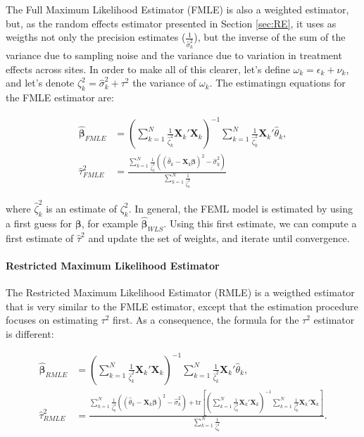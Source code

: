 \documentclass[
]{book}
\theoremstyle{definition}
\theoremstyle{definition}
\theoremstyle{definition}
\theoremstyle{definition}
\theoremstyle{remark}
\begin{document}
The Full Maximum Likelihood Estimator (FMLE) is also a weighted estimator, but, as the random effects estimator presented in Section \ref{sec:RE}, it uses as weigths not only the precision estimates (\(\frac{1}{\hat{\sigma}^2_k}\)), but the inverse of the sum of the variance due to sampling noise and the variance due to variation in treatment effects across sites.
In order to make all of this clearer, let's define \(\omega_k = \epsilon_k + \nu_k\), and let's denote \(\zeta^2_{k}=\hat{\sigma}^2_k+\tau^2\) the variance of \(\omega_k\).
The estimatingn equations for the FMLE estimator are:

\begin{align*}
  \mathbf{\hat{\beta}}_{FMLE} & = \left(\sum_{k=1}^N\frac{1}{\hat{\zeta}^2_k}\mathbf{X}_k'\mathbf{X}_k\right)^{-1}\sum_{k=1}^N\frac{1}{\hat{\zeta}^2_k}\mathbf{X}_k'\hat{\theta}_k,\\
 \hat{\tau}^2_{FMLE} & = \frac{\sum_{k=1}^N\frac{1}{\hat{\zeta}^4_k}\left((\hat{\theta}_k -\mathbf{X}_k\mathbf{\beta})^2-\hat{\sigma}^2_k\right)}{\sum_{k=1}^N\frac{1}{\hat{\zeta}^4_k}}
\end{align*}

where \(\hat{\zeta}^2_k\) is an estimate of \(\zeta^2_{k}\).
In general, the FEML model is estimated by using a first guess for \(\mathbf{\beta}\), for example \(\mathbf{\hat{\beta}}_{WLS}\).
Using this first estimate, we can compute a first estimate of \(\hat{\tau}^2\) and update the set of weights, and iterate until convergence.

\hypertarget{restricted-maximum-likelihood-estimator}{%
\paragraph{Restricted Maximum Likelihood Estimator}\label{restricted-maximum-likelihood-estimator}}

The Restricted Maximum Likelihood Estimator (RMLE) is a weigthed estimator that is very similar to the FMLE estimator, except that the estimation procedure focuses on estimating \(\tau^2\) first.
As a consequence, the formula for the \(\tau^2\) estimator is different:

\begin{align*}
  \mathbf{\hat{\beta}}_{RMLE} & = \left(\sum_{k=1}^N\frac{1}{\hat{\zeta}^2_k}\mathbf{X}_k'\mathbf{X}_k\right)^{-1}\sum_{k=1}^N\frac{1}{\hat{\zeta}^2_k}\mathbf{X}_k'\hat{\theta}_k,\\
 \hat{\tau}^2_{RMLE} & = \frac{\sum_{k=1}^N\frac{1}{\hat{\zeta}^4_k}\left((\hat{\theta}_k -\mathbf{X}_k\mathbf{\beta})^2-\hat{\sigma}^2_k\right)
                          +\text{tr}\left[\left(\sum_{k=1}^N\frac{1}{\hat{\zeta}^2_k}\mathbf{X}_k'\mathbf{X}_k\right)^{-1}\sum_{k=1}^N\frac{1}{\hat{\zeta}^2_k}\mathbf{X}_k'\mathbf{X}_k\right]}
                          {\sum_{k=1}^N\frac{1}{\hat{\zeta}^4_k}}.
\end{align*}
\end{document}
